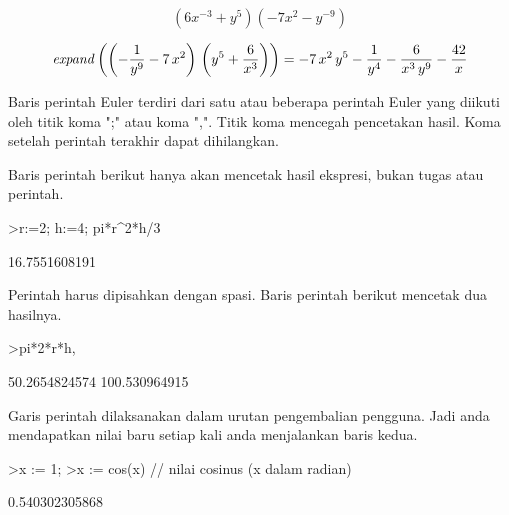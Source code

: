 \documentclass[12pt,arial,letterpaper]{book}
\begin{document}
\begin{eulerformula}
\[
(6x^{-3}+y^5)(-7x^2-y^{-9})
\]
\end{eulerformula}
\begin{eulerformula}
\[
{\it expand}\left(\left(-\frac{1}{y^9}-7\,x^2\right)\,\left(y^5+
 \frac{6}{x^3}\right)\right)=-7\,x^2\,y^5-\frac{1}{y^4}-\frac{6}{x^3
 \,y^9}-\frac{42}{x}
\]
\end{eulerformula}
\begin{eulercomment}
\end{eulercomment}
\begin{eulercomment}
Baris perintah Euler terdiri dari satu atau beberapa perintah Euler
yang diikuti oleh titik koma ";" atau koma ",".  Titik koma mencegah
pencetakan hasil.  Koma setelah perintah terakhir dapat dihilangkan.

Baris perintah berikut hanya akan mencetak hasil ekspresi, bukan tugas
atau perintah.
\end{eulercomment}
\begin{eulerprompt}
>r:=2; h:=4; pi*r^2*h/3
\end{eulerprompt}
\begin{euleroutput}
  16.7551608191
\end{euleroutput}
\begin{eulercomment}
Perintah harus dipisahkan dengan spasi.  Baris perintah berikut
mencetak dua hasilnya.
\end{eulercomment}
\begin{eulerprompt}
>pi*2*r*h, %
\end{eulerprompt}
\begin{euleroutput}
  50.2654824574
  100.530964915
\end{euleroutput}
\begin{eulercomment}
Garis perintah dilaksanakan dalam urutan pengembalian pengguna.  Jadi
anda mendapatkan nilai baru setiap kali anda menjalankan baris kedua.
\end{eulercomment}
\begin{eulerprompt}
>x := 1;
>x := cos(x) // nilai cosinus (x dalam radian)
\end{eulerprompt}
\begin{euleroutput}
  0.540302305868
\end{euleroutput}
\end{document}
